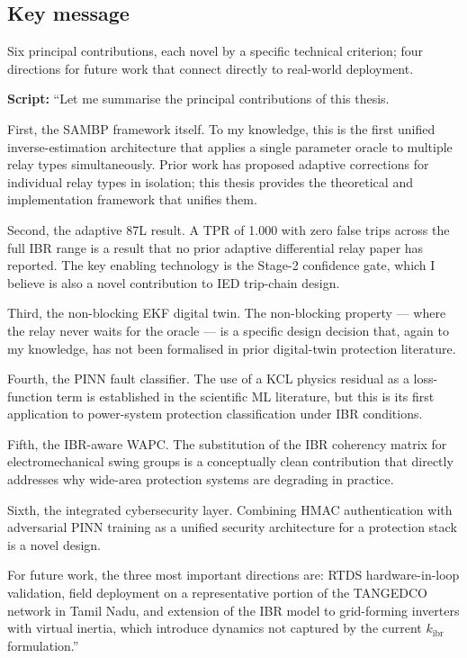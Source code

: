 \documentclass[11pt,a4paper]{article}
\newcommand{\script}[1]{\begin{scriptbox}\textbf{Script:} #1\end{scriptbox}}
\newcommand{\kibr}{k_{\mathrm{ibr}}}
\begin{document}
\subsection*{Key message}
Six principal contributions, each novel by a specific technical criterion; four directions
for future work that connect directly to real-world deployment.

\script{%
``Let me summarise the principal contributions of this thesis.

First, the SAMBP framework itself. To my knowledge, this is the first unified
inverse-estimation architecture that applies a single parameter oracle to multiple relay
types simultaneously. Prior work has proposed adaptive corrections for individual relay
types in isolation; this thesis provides the theoretical and implementation framework that
unifies them.

Second, the adaptive 87L result. A TPR of 1.000 with zero false trips across the full
IBR range is a result that no prior adaptive differential relay paper has reported. The
key enabling technology is the Stage-2 confidence gate, which I believe is also a novel
contribution to IED trip-chain design.

Third, the non-blocking EKF digital twin. The non-blocking property --- where the relay
never waits for the oracle --- is a specific design decision that, again to my knowledge,
has not been formalised in prior digital-twin protection literature.

Fourth, the PINN fault classifier. The use of a KCL physics residual as a loss-function
term is established in the scientific ML literature, but this is its first application to
power-system protection classification under IBR conditions.

Fifth, the IBR-aware WAPC. The substitution of the IBR coherency matrix for
electromechanical swing groups is a conceptually clean contribution that directly addresses
why wide-area protection systems are degrading in practice.

Sixth, the integrated cybersecurity layer. Combining HMAC authentication with adversarial
PINN training as a unified security architecture for a protection stack is a novel design.

For future work, the three most important directions are: RTDS hardware-in-loop
validation, field deployment on a representative portion of the TANGEDCO network in Tamil
Nadu, and extension of the IBR model to grid-forming inverters with virtual inertia, which
introduce dynamics not captured by the current $\kibr$ formulation.''%
}
\end{document}
